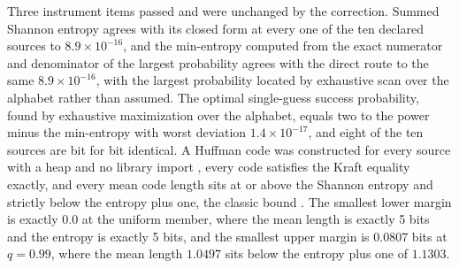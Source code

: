 \documentclass[aps,pre,reprint,nofootinbib]{revtex4-2}
\begin{document}
Three instrument items passed and were unchanged by the
correction.  Summed Shannon entropy agrees with its closed form at
every one of the ten declared sources to $8.9\times10^{-16}$, and the
min-entropy computed from the exact numerator and denominator of the
largest probability agrees with the direct route to the same
$8.9\times10^{-16}$, with the largest probability located by
exhaustive scan over the alphabet rather than assumed.  The optimal
single-guess success probability, found by exhaustive maximization
over the alphabet, equals two to the power minus the min-entropy with
worst deviation $1.4 \times 10^{-17}$, and eight of the ten sources
are bit for bit identical.  A Huffman code was constructed for every
source with a heap and no library import \cite{Huffman1952}, every
code satisfies the Kraft equality exactly, and every mean code length
sits at or above the Shannon entropy and strictly below the entropy
plus one, the classic bound \cite{CoverThomas2006}.  The smallest
lower margin is exactly $0.0$ at the uniform member, where the mean
length is exactly 5 bits and the entropy is exactly 5 bits, and the
smallest upper margin is $0.0807$ bits at $q = 0.99$, where the mean
length $1.0497$ sits below the entropy plus one of $1.1303$.
\end{document}
